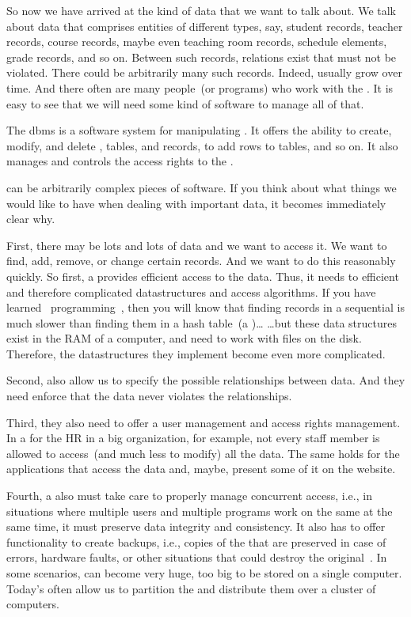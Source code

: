 So now we have arrived at the kind of data that we want to talk about.
We talk about data that comprises entities of different types, say, student records, teacher records, course records, maybe even teaching room records, schedule elements, grade records, and so on.
Between such records, relations exist that must not be violated.
There could be arbitrarily many such records.
Indeed,  usually grow over time.
And there often are many people~(or programs) who work with the .
It is easy to see that we will need some kind of software to manage all of that.%
%
\begin{definition}%
The \acrfull{dbms} is a software system for manipulating . %
It offers the ability to create, modify, and delete , tables, and records, to add rows to tables, and so on.
It also manages and controls the access rights to the .%
\end{definition}%
%
 can be arbitrarily complex pieces of software.
If you think about what things we would like to have when dealing with important data, it becomes immediately clear why.

First, there may be lots and lots of data and we want to access it.
We want to find, add, remove, or change certain records.
And we want to do this reasonably quickly.
So first, a  provides efficient access to the data.
Thus, it needs to efficient and therefore complicated datastructures and access algorithms.
If you have learned \python\ programming~\cite{programmingWithPython}, then you will know that finding records in a sequential  is much slower than finding them in a hash table~(a )\dots
{\dots}but these data structures exist in the RAM of a computer, and  need to work with files on the disk.
Therefore, the datastructures they implement become even more complicated.

Second,  also allow us to specify the possible relationships between data.
And they need enforce that the data never violates the relationships.

Third, they also need to offer a user management and access rights management.
In a  for the \acrfull{HR} in a big organization, for example, not every  staff member is allowed to access~(and much less to modify) all the data.
The same holds for the applications that access the data and, maybe, present some of it on the website.

Fourth, a  also must take care to properly manage concurrent access, i.e., in situations where multiple users and multiple programs work on the same  at the same time, it must preserve data integrity and consistency.
It also has to offer functionality to create backups, i.e., copies of the  that are preserved in case of errors, hardware faults, or other situations that could destroy the original~.
In some scenarios,  can become very huge, too big to be stored on a single computer.
Today's  often allow us to partition the  and distribute them over a cluster of computers.

